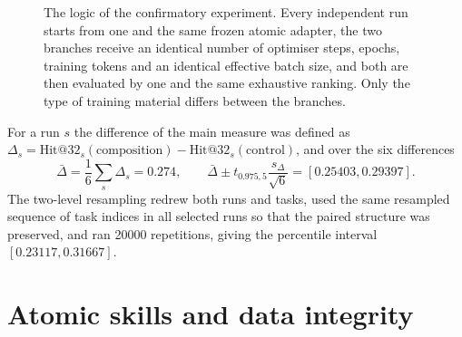 \documentclass{zapiski}
\begin{document}
\begin{figure}[!tbh]
\centering
{}
\caption{The logic of the confirmatory experiment. Every independent run starts from
one and the same frozen atomic adapter, the two branches receive an identical number
of optimiser steps, epochs, training tokens and an identical effective batch size,
and both are then evaluated by one and the same exhaustive ranking. Only the type of
training material differs between the branches.}
\label{fig:design}
\end{figure}








For a run $s$ the difference of the main measure was defined as
$\Delta_s = \text{Hit@32}_s(\text{composition}) - \text{Hit@32}_s(\text{control})$,
and over the six differences
\begin{equation}
\bar{\Delta} = \frac{1}{6} \sum_{s} \Delta_s = 0.274,
\qquad
\bar{\Delta} \pm t_{0.975, 5} \frac{s_\Delta}{\sqrt{6}} = [0.25403, 0.29397].
\label{eq:ci}
\end{equation}
The two-level resampling redrew both runs and tasks, used the same resampled sequence
of task indices in all selected runs so that the paired structure was preserved, and
ran 20000 repetitions, giving the percentile interval $[0.23117, 0.31667]$.

\section{Atomic skills and data integrity}
\label{app:integrity}
\end{document}
